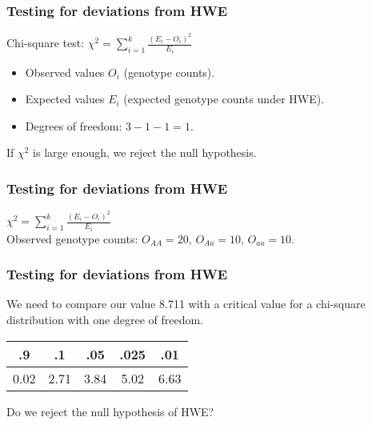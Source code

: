 \documentclass{beamer}
\newcommand{\1}{\ensuremath{\mathbf{1}}}
\begin{document}
%
%
%
\begin{frame}\frametitle{Testing for deviations from HWE}
	Chi-square test: $\chi^2 = \sum_{i=1}^k \frac{(E_i - O_i)^2}{E_i}$
	\begin{itemize}
		\item Observed values $O_i$ (genotype counts).
		\item Expected values $E_i$ (expected genotype counts under HWE).
		\item Degrees of freedom: $3-1-1=1$.
	\end{itemize}
	If $\chi^2$ is large enough, we reject the null hypothesis.
\end{frame}
%
%
%
\begin{frame}\frametitle{Testing for deviations from HWE}
	$\chi^2 = \sum_{i=1}^k \frac{(E_i - O_i)^2}{E_i}$\\[1.5ex]
	Observed genotype counts: $O_{AA} = 20$, $O_{Aa} = 10$, $O_{aa} = 10$.
	\begin{itemize}
	\end{itemize}
\end{frame}
%
%
%
\begin{frame}\frametitle{Testing for deviations from HWE}
	We need to compare our value 8.711 with a critical value for a chi-square distribution with one degree of freedom.
	\begin{center}
	\begin{tabular}{|c|c|c|c|c|}
		\toprule
		.9		& .1	& .05	& .025	& .01	\\
		\midrule
		0.02	& 2.71	& 3.84	& 5.02	& 6.63	\\
		\bottomrule
	\end{tabular}
	\end{center}
	Do we reject the null hypothesis of HWE?\\[1.5ex]
\end{frame}
\end{document}
